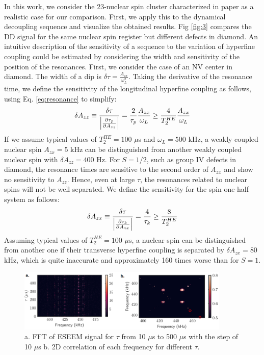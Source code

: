 \documentclass[%
 reprint,
superscriptaddress,
 amsmath,amssymb,
 aps,
]{revtex4-2}
\begin{document}
In this work, we consider the 23-nuclear spin cluster characterized in paper \cite{abobeih2019atomic} as a realistic case for our comparison.
First, we apply this to the dynamical decoupling sequence and visualize the obtained results. Fig \ref{fig:3} compares the DD signal for the same nuclear spin register but different defects in diamond.
An intuitive description of the sensitivity of a sequence to the variation of hyperfine coupling could be estimated by considering the width and sensitivity of the position of the resonances.
First, we consider the case of an NV center in diamond. The width of a dip is $\delta \tau = \frac{A_{zx}}{\omega_L^2}$. Taking the derivative of the resonance time, we define the sensitivity of the longitudinal hyperfine coupling as follows, using Eq. \ref{eq:resonance} to simplify:
\begin{gather}
	\delta A_{zz} \equiv \frac{\delta \tau}{\abs{\frac{\partial \tau_p}{\partial A_{zz}}}} = \frac{2}{\tau_p} \frac{A_{zx}}{\omega_L} \ge \frac{4}{T_2^{HE}} \frac{A_{zx}}{\omega_L}
\end{gather}
If we assume typical values of $T_2^{HE} = 100$ $\mu$s and $\omega_L=500$ kHz, a weakly coupled nuclear spin $A_{zx}=5$ kHz can be distinguished from another weakly coupled nuclear spin with $\delta A_{zz} = 400$ Hz.
For $S=1/2$, such as group IV defects in diamond, the resonance times are sensitive to the second order of $A_{zx}$ and show no sensitivity to $A_{zz}$.
Hence, even at large $\tau$, the resonances related to nuclear spins will not be well separated.
We define the sensitivity for the spin one-half system as follows:
\begin{gather}
	\delta A_{zx} \equiv \frac{\delta \tau}{\abs{\frac{\partial \tau_k}{\partial A_{zx}}}} = \frac{4}{\tau_k} \ge \frac{8}{T_2^{HE}}
\end{gather}
Assuming typical values of $T_2^{HE} = 100$ $\mu$s, a nuclear spin can be distinguished from another one if their transverse hyperfine coupling is separated by $\delta A_{zx} = 80$ kHz, which is quite inaccurate and approximately 160 times worse than for $S=1$.
\begin{figure}%
	\begin{center}
		\includegraphics[width=0.9\textwidth]{pict/fig5.png}
		\caption{a. FFT of ESEEM signal for $\tau$ from 10 $\mu$s to 500 $\mu$s with the step of 10 $\mu$s b. 2D correlation of each frequency for different $\tau$.}
		\label{fig:4}
	\end{center}
\end{figure}
\end{document}
